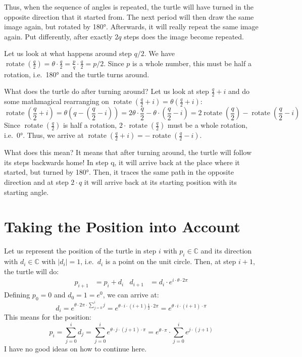 \documentclass[pdftex,a4paper]{scrartcl}
\DeclareMathOperator{\rotate}{rotate}
\begin{document}
Thus, when the sequence of angles is repeated, the turtle will have turned in the opposite direction that it started
from. The next period will then draw
the same image again, but rotated by 180°. Afterwards, it will really repeat the same image again. Put differently,
after exactly \(2q\) steps does the image become repeated.

Let us look at what happens around step \(q/2\). We have \(\rotate(\frac{q}{2})=\theta\cdot \frac{q}{2}
= \frac{p}{q} \cdot \frac{q}{2} = p/2\). Since \(p\) is a whole number, this must be half a rotation, i.e.\ 180° and the
turtle turns around.

What does the turtle do after turning around? Let us look at step \(\frac{q}{2}+i\) and do some mathmagical rearranging
on
\(
\rotate\left(\frac{q}{2}+i\right)
=\theta\left(\frac{q}{2}+i\right)
\):
\[
\rotate\left(\frac{q}{2}+i\right)
=\theta\left(q-\left(\frac{q}{2}-i\right)\right)
=2\theta\cdot \frac{q}{2} - \theta\cdot\left(\frac{q}{2}-i\right)
=2\rotate\left(\frac{q}{2}\right)-\rotate\left(\frac{q}{2}-i\right)
\]
Since \(\rotate(\frac{q}{2})\) is half a rotation, \(2\cdot\rotate(\frac{q}{2})\) must be a whole rotation, i.e.\ 0°. Thus,
we arrive at \(\rotate(\frac{q}{2}+i)=-\rotate(\frac{q}{2}-i)\).

What does this mean? It means that after turning around, the turtle will follow its steps backwards home! In step
q, it will arrive back at the place where it started, but turned by 180°. Then, it traces the same path in the opposite
direction and at step \(2\cdot q\) it will arrive back at its starting position with its starting angle.

\section{Taking the Position into Account}
Let us represent the position of the turtle in step \(i\) with \(p_i\in\mathbb{C}\) and its direction with
\(d_i\in\mathbb{C}\) with \(|d_i|=1\), i.e.\ \(d_i\) is a point on the unit circle. Then, at step \(i+1\), the turtle
will do:
\begin{align*}
p_{i+1} &= p_i + d_i &
d_{i+1} &= d_i \cdot e^{i\cdot \theta\cdot 2\pi}
\end{align*}
Defining \(p_0=0\) and \(d_0=1=e^0\), we can arrive at:
\[
d_i = e^{\theta\cdot 2\pi\cdot \sum_{j=0}^i j}
= e^{\theta\cdot i\cdot(i+1)\frac{1}{2}\cdot 2\pi}
= e^{\theta\cdot i\cdot(i+1)\cdot \pi}
\]
This means for the position:
\[
p_i = \sum_{j=0}^i d_j
= \sum_{j=0}^i e^{\theta\cdot j\cdot(j+1)\cdot\pi}
= e^{\theta\cdot\pi}\cdot \sum_{j=0}^i e^{j\cdot(j+1)}
\]
I have no good ideas on how to continue here.
\end{document}
